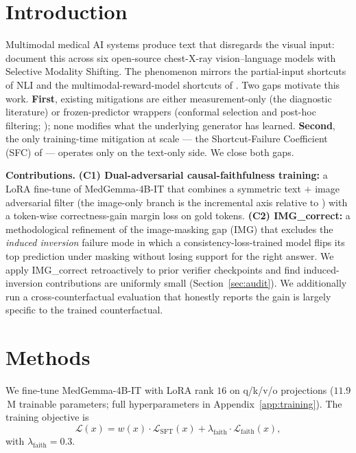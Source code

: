 \documentclass{article}
\begin{document}
\section{Introduction}
\label{sec:intro}

Multimodal medical AI systems produce text that disregards the
visual input: \citet{restrepo2025sms} document this across six
open-source chest-X-ray vision--language models with Selective
Modality Shifting. The phenomenon mirrors the partial-input
shortcuts of NLI \citep{gururangan2018annotation,
poliak2018hypothesis} and the multimodal-reward-model shortcuts of
\citet{li2025sfc}. Two gaps motivate this work. \textbf{First},
existing mitigations are either measurement-only (the diagnostic
literature) or frozen-predictor wrappers (conformal selection and
post-hoc filtering; \citealp{gui2024conformal, li2025conflvlm,
mohri2024conformal}); none modifies what the underlying generator
has learned. \textbf{Second}, the only training-time mitigation at
scale --- the Shortcut-Failure Coefficient (SFC) of
\citet{li2025sfc} --- operates only on the text-only side. We close
both gaps.

\textbf{Contributions.} \textbf{(C1) Dual-adversarial
causal-faithfulness training:} a LoRA fine-tune of MedGemma-4B-IT
\citep{google2024medgemma, hu2022lora} that combines a symmetric
text $+$ image adversarial filter (the image-only branch is the
incremental axis relative to \citealp{li2025sfc}) with a
token-wise correctness-gain margin loss on gold tokens.
\textbf{(C2) IMG\_correct:} a methodological refinement of the
image-masking gap (IMG) that excludes the \emph{induced inversion}
failure mode in which a consistency-loss-trained model flips its
top prediction under masking without losing support for the right
answer. We apply IMG\_correct retroactively to prior verifier
checkpoints and find induced-inversion contributions are uniformly
small (Section~\ref{sec:audit}). We additionally run a
cross-counterfactual evaluation that honestly reports the gain is
largely specific to the trained counterfactual.

\section{Methods}
\label{sec:methods}

We fine-tune MedGemma-4B-IT \citep{google2024medgemma} with LoRA
\citep{hu2022lora} rank $16$ on q/k/v/o projections
($11.9$\,M trainable parameters; full hyperparameters in
Appendix~\ref{app:training}). The training objective is
\begin{equation}
\mathcal{L}(x) = w(x)\cdot\mathcal{L}_{\mathrm{SFT}}(x) +
\lambda_{\mathrm{faith}}\cdot\mathcal{L}_{\mathrm{faith}}(x),
\end{equation}
with $\lambda_{\mathrm{faith}} = 0.3$.
\end{document}
